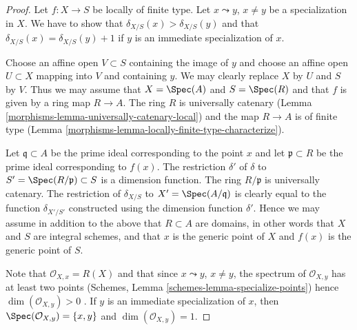 \begin{proof}

Let $f : X \to S$ be locally of finite type.
Let $x \leadsto y$, $x \not = y$ be a specialization in $X$.
We have to show that $\delta_{X/S}(x) > \delta_{X/S}(y)$ and
that $\delta_{X/S}(x) = \delta_{X/S}(y) + 1$ if $y$ is an
immediate specialization of $x$.

\medskip\noindent
Choose an affine open $V \subset S$ containing the image of
$y$ and choose an affine open $U \subset X$ mapping into $V$
and containing $y$. We may clearly replace $X$ by $U$ and
$S$ by $V$. Thus we may assume that $X = \Spec(A)$
and $S = \Spec(R)$ and that $f$ is given by a ring
map $R \to A$. The ring $R$ is universally catenary
(Lemma \ref{morphisms-lemma-universally-catenary-local})
and the map $R \to A$ is of finite type
(Lemma \ref{morphisms-lemma-locally-finite-type-characterize}).

\medskip\noindent
Let $\mathfrak q \subset A$ be the prime ideal corresponding
to the point $x$ and let $\mathfrak p \subset R$ be the prime
ideal corresponding to $f(x)$. The restriction $\delta'$ of $\delta$
to $S' = \Spec(R/\mathfrak p) \subset S$ is a dimension
function. The ring $R/\mathfrak p$ is universally catenary.
The restriction of $\delta_{X/S}$ to $X' = \Spec(A/\mathfrak q)$
is clearly equal to the function $\delta_{X'/S'}$ constructed
using the dimension function $\delta'$. Hence we may assume
in addition to the above that $R \subset A$ are domains, in
other words that $X$ and $S$ are integral schemes, and that
$x$ is the generic point of $X$ and $f(x)$ is the generic point of $S$.

\medskip\noindent
Note that $\mathcal{O}_{X, x} = R(X)$ and that since $x \leadsto y$,
$x \not = y$, the spectrum of $\mathcal{O}_{X, y}$ has at least
two points
(Schemes, Lemma \ref{schemes-lemma-specialize-points})
hence $\dim(\mathcal{O}_{X, y}) > 0$ .
If $y$ is an immediate specialization of $x$, then
$\Spec(\mathcal{O}_{X, y}) = \{x, y\}$ and
$\dim(\mathcal{O}_{X, y}) = 1$.


\end{proof}
